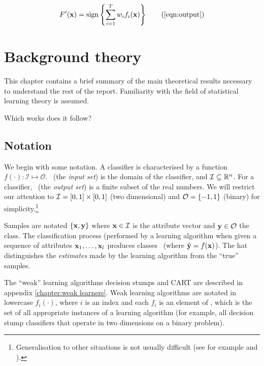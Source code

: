 \par
{} 
\begin{equation}
F'(\bfx) = \sign \left\{ \sum_{i=1}^T w_i f_i(\bfx) \right\}
\tag{\ref{eqn:output}}
\end{equation}


\chapter{Background theory}

This chapter contains a brief summary of the main theoretical results
necessary to understand the rest of the report.  Familiarity with the
field of statistical learning theory is assumed.

Which works does it follow?



\section{Notation}

We begin with some notation.  A classifier is characterised by a
function $f(\cdot) : \mathcal{I} \mapsto \mathcal {O}$.  \calI\
(the \emph{input set}) is the domain of the classifier, and
$\mathcal{I} \subseteq \mathbb{R}^n$.  For a classifier, \calO\ (the \emph{output set}) is a finite subset of the real numbers.  We will restrict our attention to
$\mathcal{I} = [0,1] \times [0,1]$ (two dimensional) and $\mathcal{O} = \{-1,1\}$
(binary) for simplicity.\footnote{Generalisation to other situations is not
usually difficult (see for example \cite{Freund96} and
\cite{Cherkassky98}).}

Samples are notated $\{\mathbf{x}, \mathbf{y}\}$ where $\mathbf{x} \in \mathcal{I}$ is the
attribute vector and $\mathbf{y} \in \mathcal{O}$ the class.  The classification
process (performed by a learning algorithm when given a sequence of
attributes $\mathbf{x}_1, \ldots, \mathbf{x}_l$ produces classes \bfyh\ (where
$\hat{\mathbf{y}} = f(\mathbf{x})$).  The hat distinguishes the \emph{estimates} made
by the learning algorithm from the ``true'' samples.

The ``weak'' learning algorithms decision stumps and CART are
described in appendix \ref{chapter:weak learners}.  Weak learning
algorithms are notated in lowercase $f_i(\cdot)$, where $i$ is an
index and each $f_i$ is an element of \calF, which is the set of all
appropriate instances of a learning algorithm (for example, all
decision stump classifiers that operate in two dimensions on a binary
problem). 

